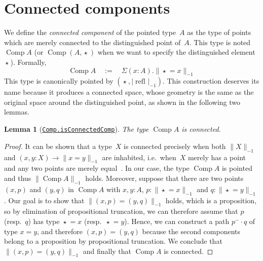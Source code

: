 \documentclass[10pt,a4paper]{amsart}
\newtheorem{lemma}[theorem]{Lemma}
\theoremstyle{definition}
\newcommand{\pt}[1]{\star_{#1}} %
\newcommand{\trunc}[2]{\|#2\|_{#1}} %
\newcommand{\ptrunc}[1]{\trunc{-1}{#1}} %
\newcommand{\trunq}[2]{|#2|_{#1}} %
\newcommand{\ptrunq}[1]{\trunq{-1}{#1}} %
\newcommand{\defd}{:=} %
\newcommand{\qdefd}{\quad\defd\quad}
\newcommand{\refl}[1]{\operatorname{refl}_{#1}} %
\newcommand{\pcomp}{\cdot} %
\newcommand{\sym}[1]{#1^-} %
\newcommand{\Comp}{\operatorname{Comp}} %
\newcommand{\ie}{i.e.~}
\newcommand{\resp}{resp.~}
\newcommand{\agda}[2]{\href{https://smimram.github.io/generated-deloopings-agda/#1.html\##2}{\texttt{#1.#2}}}
\begin{document}
\section{Connected components}
\label{connected-component}
We define the \emph{connected component} of the pointed type~$A$ as the type of
points which are merely connected to the distinguished point of~$A$. This type
is noted~$\Comp A$ (or $\Comp(A,\pt{})$ when we want to specify the
distinguished element~$\pt{}$). Formally,
\[
  \Comp A
  \qdefd
  \Sigma(x:A).\ptrunc{\pt{}=x}
\]
This type is canonically pointed by $(\pt{},\ptrunq{\refl{}})$.
%
This construction deserves its name because it produces a connected space, whose
geometry is the same as the original space around the distinguished point, as
shown in the following two lemmas.

\begin{lemma}[\agda{Comp}{isConnectedComp}]
  The type $\Comp A$ is connected.
\end{lemma}
\begin{proof}
  It can be shown that a type~$X$ is connected precisely when both $\ptrunc{X}$
  and $(x,y:X)\to\ptrunc{x=y}$ are inhabited, \ie when~$X$ merely has a point
  and any two points are merely equal~\cite[Exercise~7.6]{hottbook}.
  In our case, the type $\Comp A$ is pointed and thus $\ptrunc{\Comp A}$
  holds.
  Moreover, suppose that there are two points $(x,p)$ and $(y,q)$ in $\Comp A$
  with $x,y:A$, $p:\ptrunc{\pt{}=x}$ and $q:\ptrunc{\pt{}=y}$. Our goal is to
  show that $\ptrunc{(x,p)=(y,q)}$ holds, which is a proposition, so by
  elimination of propositional truncation, we can therefore assume that $p$
  (\resp $q$) has type $\pt{}=x$ (\resp $\pt{}=y$). Hence, we can construct a path
  $\sym p\pcomp q$ of type $x=y$, and therefore $(x,p)=(y,q)$ because the second
  components belong to a proposition by propositional truncation. We conclude
  that $\ptrunc{(x,p)=(y,q)}$ and finally that $\Comp A$ is connected.
\end{proof}
\end{document}
